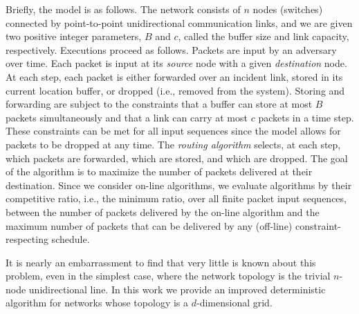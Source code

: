 \documentclass[11pt]{article}
\newenvironment{proof sketch}[1]{\noindent {\emph{Proof sketch of #1:}}}{\hfill \qed}
\begin{document}
Briefly, the model is as follows.  The network consists of $n$ nodes
(switches) connected by point-to-point unidirectional communication
links, and we are given
two positive integer parameters, $B$ and $c$, called the buffer size
and link capacity, respectively.
Executions proceed as follows.
Packets are input by an adversary over time. Each packet is input at its \emph{source} node with a
given \emph{destination} node.
At each step, each packet is either forwarded over an incident link,
stored in its current location buffer, or dropped (i.e., removed from
the system).
Storing and forwarding are subject to the constraints that a buffer
can store at most $B$ packets simultaneously and that a link can carry
at most $c$ packets in a time step.  These constraints can be met for
all input sequences since the model allows for packets to be
{dropped} at any time.  The \emph{routing algorithm} selects, at
each step, which packets are forwarded, which are stored, and which
are dropped.  The goal of the algorithm is to maximize the number of
packets delivered at their destination.  Since we consider on-line
algorithms, we evaluate algorithms by their competitive ratio, i.e.,
the minimum ratio, over all finite packet input sequences, between the
number of packets delivered by the on-line algorithm and the maximum
number of packets that can be delivered by any (off-line)
constraint-respecting schedule.

It is nearly an embarrassment to find that very little is known about
this problem, even in the simplest case, where the network topology is
the trivial $n$-node unidirectional line. In this work we provide
an improved deterministic algorithm  for networks whose topology is
a $d$-dimensional grid.
\end{document}
